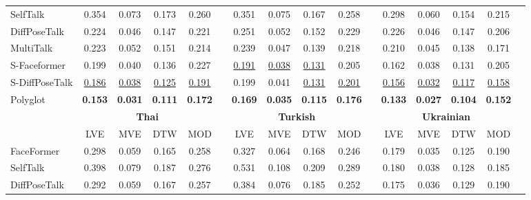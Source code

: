 \documentclass[a4paper, 10pt, conference]{ieeeconf}      %
\begin{document}
\begin{table}[ht!]
{\begin{tabular}{@{}l@{\hspace{0.1cm}}ccccccccccccccc@{}}
        SelfTalk  & 0.354 & 0.073 & 0.173 & 0.260 && 0.351 & 0.075 & 0.167 & 0.258 && 0.298 & 0.060 & 0.154 & 0.215  \\

        DiffPoseTalk & 0.224 & 0.046 & 0.147 & 0.221 && 0.251 & 0.052 & 0.152 & 0.229 && 0.226 & 0.046 & 0.147 & 0.206  \\

        MultiTalk & 0.223 & 0.052 & 0.151 & 0.214 && 0.239 & 0.047 & 0.139 & 0.218 && 0.210 & 0.045 & 0.138 & 0.171 \\
        
        \midrule

        S-Faceformer & 0.199 & 0.040 & 0.136 & 0.227 && \underline{0.191} & \underline{0.038} & \underline{0.131} & 0.205 && 0.162 & 0.038 & 0.131 & 0.205 \\

        S-DiffPoseTalk & \underline{0.186} & \underline{0.038} & \underline{0.125} & \underline{0.191} && 0.199 & 0.041 & \underline{0.131} & \underline{0.201} && \underline{0.156} & \underline{0.032} & \underline{0.117} & \underline{0.158} \\
        
        \midrule

        Polyglot & \textbf{0.153} & \textbf{0.031} & \textbf{0.111} & \textbf{0.172} && \textbf{0.169} & \textbf{0.035} & \textbf{0.115} & \textbf{0.176} && \textbf{0.133} & \textbf{0.027} & \textbf{0.104} & \textbf{0.152} \\
        
        \midrule
        \midrule

        & \multicolumn{4}{c}{\textbf{Thai}} & \phantom{abc} & \multicolumn{4}{c}{\textbf{Turkish}} &
        \phantom{abc} & \multicolumn{4}{c}{\textbf{Ukrainian}} 
        \\
        \cmidrule{2-5} \cmidrule{7-10} \cmidrule{12-15} 
         & LVE  & MVE  & DTW  & MOD  && LVE  & MVE  & DTW  & MOD  && LVE  & MVE  & DTW  & MOD \\
        \midrule
        FaceFormer & 0.298 & 0.059 & 0.165 & 0.258 && 0.327 & 0.064 & 0.168 & 0.246 && 0.179 & 0.035 & 0.125 & 0.190  \\

        SelfTalk  & 0.398 & 0.079 & 0.187 & 0.276 && 0.531 & 0.108 & 0.209 & 0.289 && 0.180 & 0.038 & 0.128 & 0.185  \\
        
        DiffPoseTalk & 0.292 & 0.059 & 0.167 & 0.257 && 0.384 & 0.076 & 0.185 & 0.252 && 0.175 & 0.036 & 0.129 & 0.190  \\
        

\end{tabular}}
\end{table}
\end{document}
